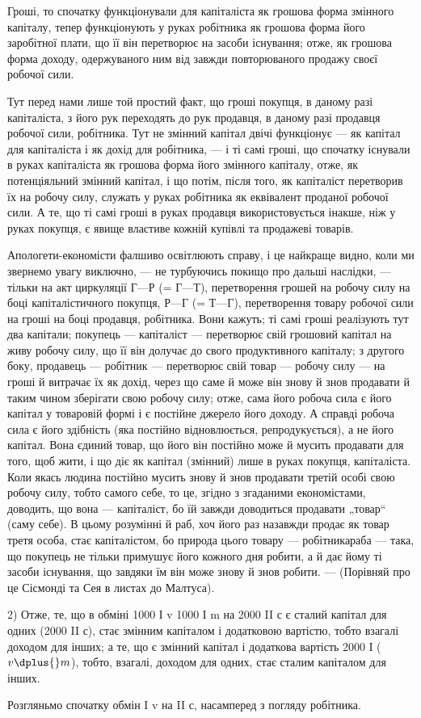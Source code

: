 
Гроші, то спочатку функціонували для капіталіста як грошова
форма змінного капіталу, тепер функціонують у руках робітника як
грошова форма його заробітної плати, що її він перетворює на засоби
існування; отже, як грошова форма доходу, одержуваного ним від
завжди повторюваного продажу своєї робочої сили.

Тут перед нами лише той простий факт, що гроші покупця, в
даному разі капіталіста, з його рук переходять до рук продавця, в
даному разі продавця робочої сили, робітника. Тут не змінний капітал
двічі функціонує — як капітал для капіталіста і як дохід для робітника, —
і ті самі гроші, що спочатку існували в руках капіталіста як грошова
форма його змінного капіталу, отже, як потенціяльний змінний капітал, і
що потім, після того, як капіталіст перетворив їх на робочу силу, служать
у руках робітника як еквівалент проданої робочої сили. А те, що ті
самі гроші в руках продавця використовується інакше, ніж у руках покупця,
є явище властиве кожній купівлі та продажеві товарів.

Апологети-економісти фалшиво освітлюють справу, і це найкраще
видно, коли ми звернемо увагу виключно, — не турбуючись покищо про
дальші наслідки, — тільки на акт циркуляції $Г — Р$ (= $Г — Т$), перетворення
грошей на робочу силу на боці капіталістичного покупця, $Р — Г$ (= $Т — Г$),
перетворення товару робочої сили на гроші на боці продавця, робітника.
Вони кажуть; ті самі гроші реалізують тут два капітали; покупець —
капіталіст — перетворює свій грошовий капітал на живу робочу силу, що
її він долучає до свого продуктивного капіталу; з другого боку, продавець
— робітник — перетворює свій товар — робочу силу — на гроші й
витрачає їх як дохід, через що саме й може він знову й знов продавати
й таким чином зберігати свою робочу силу; отже, сама його робоча
сила є його капітал у товаровій формі і є постійне джерело його доходу.
А справді робоча сила є його здібність (яка постійно відновлюється,
репродукується), а не його капітал. Вона єдиний товар, що його він
постійно може й мусить продавати для того, щоб жити, і що діє як
капітал (змінний) лише в руках покупця, капіталіста. Коли якась людина
постійно мусить знову й знов продавати третій особі свою робочу силу,
тобто самого себе, то це, згідно з згаданими економістами, доводить,
що вона — капіталіст, бо їй завжди доводиться продавати „товар“ (саму
себе). В цьому розумінні й раб, хоч його раз назавжди продає як
товар третя особа, стає капіталістом, бо природа цього товару — робітникараба
— така, що покупець не тільки примушує його кожного дня робити,
а й дає йому ті засоби існування, що завдяки їм він може знову й
знов робити. — (Порівняй про це Сісмонді та Сея в листах до Малтуса).

2) Отже, те, що в обміні 1000 І v \dplus{} 1000 І m на 2000 II с є сталий
капітал для одних (2000 II с), стає змінним капіталом і додатковою
вартістю, тобто взагалі доходом для інших; а те, що є змінний капітал
і додаткова вартість 2000 І ($v \dplus{} m$), тобто, взагалі, доходом для одних,
стає сталим капіталом для інших.

Розгляньмо спочатку обмін I v на II с, насамперед з погляду робітника.
